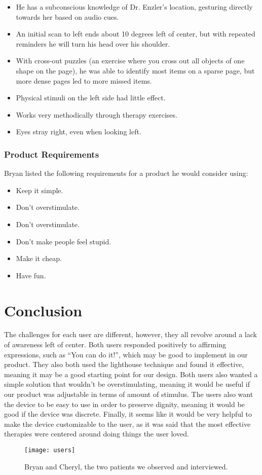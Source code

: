\begin{itemize}
\item He has a subconscious knowledge of Dr. Enzler’s location, gesturing
  directly towards her based on audio cues.
\item An initial scan to left ends about 10 degrees left of center, but with
  repeated reminders he will turn his head over his shoulder.
\item With cross-out puzzles (an exercise where you cross out all objects of
  one shape on the page), he was able to identify most items on a sparse page,
  but more dense pages led to more missed items.
\item Physical stimuli on the left side had little effect.
\item Works very methodically through therapy exercises.
\item Eyes stray right, even when looking left. 
\end{itemize}

\subsubsection{Product Requirements}

Bryan listed the following requirements for a product he would consider using:
\begin{itemize}
\item Keep it simple.
\item Don’t overstimulate.
\item Don’t overstimulate.
\item Don’t make people feel stupid.
\item Make it cheap.
\item Have fun.
\end{itemize}

\section{Conclusion}
The challenges for each user are different, however, they all revolve around a
lack of awareness left of center. Both users responded positively to affirming
expressions, such as “You can do it!”, which may be good to implement in our
product. They also both used the lighthouse technique and found it effective,
meaning it may be a good starting point for our design. Both users also wanted
a simple solution that wouldn’t be overstimulating, meaning it would be useful
if our product was adjustable in terms of amount of stimulus.  The users also
want the device to be easy to use in order to preserve dignity, meaning it
would be good if the device was discrete. Finally, it seems like it would be
very helpful to make the device customizable to the user, as it was said that
the most effective therapies were centered around doing things the user loved.

\begin{figure}[h]
  \centering
  \texttt{[image: users]}
  \caption[Users that were observed]{Bryan and Cheryl, the two patients we
    observed and interviewed.}
\end{figure}

